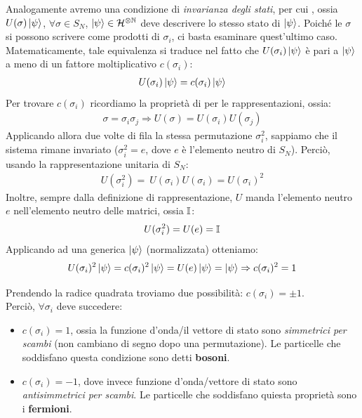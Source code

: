 \documentclass[../../FisicaTeorica.tex]{subfiles}
\begin{document}
Analogamente avremo una condizione di \textit{invarianza degli stati}, per cui , ossia $U(\sigma)\Ket{\psi}$, $\forall \sigma \in S_N$, $\Ket{\psi} \in \mathcal{H}^{\otimes \mathbb{N}}$ deve descrivere lo stesso stato di $\Ket{\psi}$. Poiché le $\sigma$ si possono scrivere come prodotti di $\sigma_i$, ci basta esaminare quest'ultimo caso.\\
Matematicamente, tale equivalenza si traduce nel fatto che $U(\sigma_i)\Ket{\psi}$ è pari a $\Ket{\psi}$ a meno di un fattore moltiplicativo $c(\sigma_i)$:
\begin{align*}
U(\sigma_i)\Ket{\psi} = c(\sigma_i)\Ket{\psi}
\end{align*}
Per trovare $c(\sigma_i)$ ricordiamo la proprietà di  per le rappresentazioni, ossia:
\begin{align*}
\sigma = \sigma_i \sigma_j \Rightarrow U(\sigma) = U(\sigma_i)U(\sigma_j)
\end{align*}
Applicando allora due volte di fila la stessa permutazione $\sigma_i^2$, sappiamo che il sistema rimane invariato ($\sigma_i^2 = e$, dove $e$ è l'elemento neutro di $S_N$). Perciò, usando la rappresentazione unitaria di $S_N$:
\begin{align*}
U(\sigma_i^2) =\ U(\sigma_i)U(\sigma_i)=U(\sigma_i)^2
\end{align*}
Inoltre, sempre dalla definizione di rappresentazione, $U$ manda l'elemento neutro $e$ nell'elemento neutro delle matrici, ossia $\mathbb{I}$:
\begin{align*}
U(\sigma_i^2) = U(e) = \mathbb{I}
\end{align*}
Applicando ad una generica $\Ket{\psi}$ (normalizzata) otteniamo:
\begin{align*}
U(\sigma_i)^2 \Ket{\psi} = c(\sigma_i)^2 \Ket{\psi} = U(e)\Ket{\psi} =\Ket{\psi} \Rightarrow c(\sigma_i)^2 =1
\end{align*}

Prendendo la radice quadrata troviamo due possibilità: $c(\sigma_i)=\pm 1$.\\
Perciò, $\forall \sigma_i$ deve succedere:
\begin{itemize}
\item $c(\sigma_i) = 1$, ossia la funzione d'onda/il vettore di stato sono \textit{simmetrici per scambi} (non cambiano di segno dopo una permutazione). Le particelle che soddisfano questa condizione sono detti \textbf{bosoni}.
\item $c(\sigma_i)=-1$, dove invece funzione d'onda/vettore di stato sono \textit{antisimmetrici per scambi}. Le particelle che soddisfano quiesta proprietà sono i \textbf{fermioni}.
\end{itemize}
\end{document}
